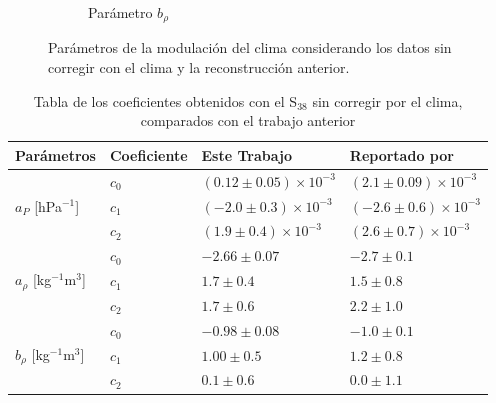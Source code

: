 \begin{figure}[H]
\begin{subfigure}[b]{\textwidth}
                \caption{Parámetro  $b_{\rho}$	 }
                \label{fig:brho_2019_S38}
                \end{subfigure}%
                \caption{Parámetros de la modulación del clima considerando los datos sin corregir con el clima y la reconstrucción anterior.}\label{fig:parameters_new_S38}
            \end{figure}
                \begin{table}[H]
                    \centering
                    \begin{tabular}{|l|l|l|l|}\hline
                     \textbf{Parámetros}						& \textbf{Coeficiente}	& \textbf{Este Trabajo} & Reportado por \textbf{ \cite{aab2017impact}}	\\ \hline
                     \multirow{3}{*}{$a_P$ [hPa$^{-1}$]}  		&  $c_0$				& $ (0.12\pm0.05)\times 10^{-3}$	    & $(2.1 \pm 0.09)\times 10^{-3} $	\\ \cline{2-4} %
                                                                &  $c_1$				& $ (-2.0\pm0.3)\times 10^{-3}$		& $(-2.6  \pm 0.6)\times 10^{-3} $	\\ \cline{2-4} 
                                                                &  $c_2$				& $ (1.9\pm0.4)\times 10^{-3}$		& $(2.6   \pm 0.7)\times 10^{-3} $	\\ \hline %
                    
                     \multirow{3}{*}{$a_\rho$ [kg$^{-1}$m$^3$]} &  $c_0$			& $-2.66   \pm 0.07$	& $ -2.7  \pm 0.1  $\\ \cline{2-4} 
                                                                 &  $c_1$			& $ 1.7    \pm 0.4 $	& $ 1.5   \pm 0.8  $\\ \cline{2-4} 
                                                                &  $c_2$			& $ 1.7    \pm 0.6 $	& $ 2.2   \pm 1.0  $\\ \hline %
                    
                    \multirow{3}{*}{$b_\rho$ [kg$^{-1}$m$^3$]} 	&  $c_0$			& $-0.98    \pm 0.08$	& $-1.0   \pm 0.1 $	\\ \cline{2-4} 
                                                                &  $c_1$			& $ 1.00    \pm 0.5$	& $ 1.2   \pm 0.8  $	\\ \cline{2-4} 
                                                                &  $c_2$			& $ 0.1    \pm 0.6$		& $ 0.0   \pm 1.1  $	\\ \hline 
                    
                    \end{tabular}	
                    \caption{Tabla de los coeficientes obtenidos con el S$_{38}$ sin corregir por el clima, comparados con el trabajo anterior} \label{tabla:cuadratica_ICRC_2019_S38}
                \end{table}

